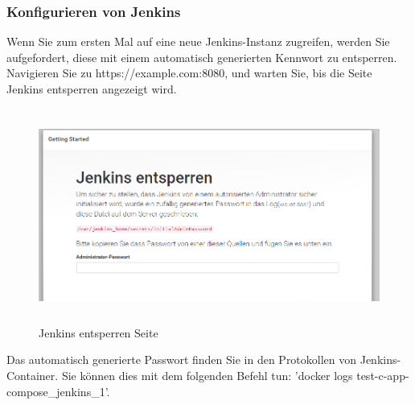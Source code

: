 \documentclass[a4paper,12pt,oneside]{book}
\begin{document}
\subsubsection{Konfigurieren von Jenkins}
Wenn Sie zum ersten Mal auf eine neue Jenkins-Instanz zugreifen, werden Sie aufgefordert, diese mit einem automatisch generierten Kennwort zu entsperren.
Navigieren Sie zu https://example.com:8080, und warten Sie, bis die Seite Jenkins entsperren angezeigt wird.
\begin{figure}[h!]
	\begin{center}
		\includegraphics[width=17cm, height=7cm]{Jenkins-entsperren-seite.PNG}
		\caption{Jenkins entsperren Seite} 
		\label{Jenkins entsperren Seite} 
	\end{center}
\end{figure}
\newpage
Das automatisch generierte Passwort finden Sie in den Protokollen von Jenkins-Container. Sie können dies mit dem folgenden Befehl tun: 'docker logs test-c-app-compose_jenkins_1'.
\end{document}
